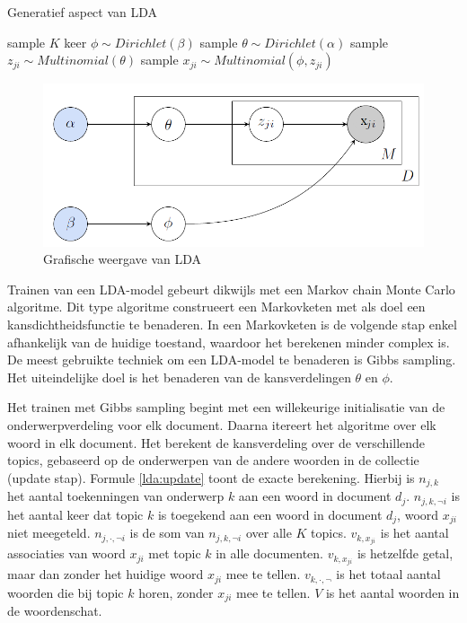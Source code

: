 \begin{algorithm}
\caption{Generatief aspect van LDA}
\begin{algorithmic} 
\STATE sample $K$ keer  $\phi \sim Dirichlet(\beta)$
\STATE sample $\theta \sim Dirichlet(\alpha)$
\STATE sample $z_{ji} \sim Multinomial(\theta)$
\STATE sample $x_{ji} \sim Multinomial(\phi,z_{ji})$
\ENDFOR
\ENDFOR
\end{algorithmic}
\label{algo:lda}
\end{algorithm}
                                  
\begin{figure}[tb]
    \centering
    \includegraphics[width=\linewidth]{Images/lda.png}
    \caption{Grafische weergave van LDA}
    \label{fig:lda}
\end{figure}

Trainen van een LDA-model gebeurt dikwijls met een Markov chain Monte Carlo algoritme. Dit type algoritme construeert een Markovketen met als doel een kansdichtheidsfunctie te benaderen. In een Markovketen is de volgende stap enkel afhankelijk van de huidige toestand, waardoor het berekenen minder complex is. De meest gebruikte techniek om een LDA-model te benaderen is Gibbs sampling. Het uiteindelijke doel is het benaderen van de kansverdelingen $\theta$ en $\phi$.

Het trainen met Gibbs sampling begint met een willekeurige initialisatie van de onderwerpverdeling voor elk document. Daarna itereert het algoritme over elk woord in elk document. Het berekent de kansverdeling over de verschillende topics, gebaseerd op de onderwerpen van de andere woorden in de collectie (update stap). Formule \eqref{lda:update} toont de exacte berekening. Hierbij is $n_{j,k}$ het aantal toekenningen van onderwerp $k$ aan een woord in document $d_j$. $n_{j,k,\neg i}$ is het aantal keer dat topic $k$ is toegekend aan een woord in document $d_j$, woord $x_{ji}$ niet meegeteld. $n_{j,\cdot,\neg i}$ is de som van $n_{j,k,\neg i}$ over alle $K$ topics. $v_{k,x_{ji}}$ is het aantal associaties van woord $x_{ji}$ met topic $k$ in alle documenten. $v_{k,x_{ji}}$ is hetzelfde getal, maar dan zonder het huidige woord $x_{ji}$ mee te tellen. $v_{k,\cdot,\neg}$ is het totaal aantal woorden die bij topic $k$ horen, zonder $x_{ji}$ mee te tellen. $V$ is het aantal woorden in de woordenschat.

